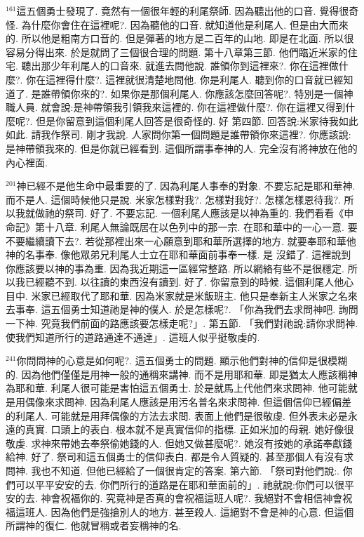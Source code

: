 \documentclass{book}
\begin{document}
$^{161}$這五個勇士發現了.
竟然有一個很年輕的利尾祭師.
因為聽出他的口音.
覺得很奇怪.
為什麼你會住在這裡呢?.
因為聽他的口音.
就知道他是利尾人.
但是由大而來的.
所以他是粗南方口音的.
但是彈著的地方是二百年的山地.
即是在北面.
所以很容易分得出來.
於是就問了三個很合理的問題.
第十八章第三節.
他們臨近米家的住宅.
聽出那少年利尾人的口音來.
就進去問他說.
誰領你到這裡來?.
你在這裡做什麼?.
你在這裡得什麼?.
這裡就很清楚地問他.
你是利尾人.
聽到你的口音就已經知道了.
是誰帶領你來的?.
如果你是那個利尾人.
你應該怎麼回答呢?.
特別是一個神職人員.
就會說:是神帶領我引領我來這裡的.
你在這裡做什麼?.
你在這裡又得到什麼呢?.
但是你留意到這個利尾人回答是很奇怪的.
好 第四節.
回答說:米家待我如此如此.
請我作祭司.
剛才我說.
人家問你第一個問題是誰帶領你來這裡?.
你應該說:是神帶領我來的.
但是你就已經看到.
這個所謂事奉神的人.
完全沒有將神放在他的內心裡面.

$^{201}$神已經不是他生命中最重要的了.
因為利尾人事奉的對象.
不要忘記是耶和華神.
而不是人.
這個時候他只是說.
米家怎樣對我?.
怎樣對我好?.
怎樣怎樣恩待我?.
所以我就做祂的祭司.
好了.
不要忘記.
一個利尾人應該是以神為重的.
我們看看《申命記》第十八章.
利尾人無論既居在以色列中的那一宗.
在耶和華中的一心一意.
要不要繼續讀下去?.
若從那裡出來一心願意到耶和華所選擇的地方.
就要奉耶和華他神的名事奉.
像他眾弟兄利尾人士立在耶和華面前事奉一樣.
是 沒錯了.
這裡說到你應該要以神的事為重.
因為我近期這一區經常整路.
所以網絡有些不是很穩定.
所以我已經聽不到.
以往讀的東西沒有讀到.
好了.
你留意到的時候.
這個利尾人他心目中.
米家已經取代了耶和華.
因為米家就是米飯班主.
他只是奉新主人米家之名來去事奉.
這五個勇士知道祂是神的僕人.
於是怎樣呢?.
「你為我們去求問神吧.
詢問一下神.
究竟我們前面的路應該要怎樣走呢?」.
第五節.
「我們對祂說:請你求問神.
使我們知道所行的道路通達不通達」.
這班人似乎挺敬虔的.

$^{241}$你問問神的心意是如何呢?.
這五個勇士的問題.
顯示他們對神的信仰是很模糊的.
因為他們僅僅是用神一般的通稱來講神.
而不是用耶和華.
即是猶太人應該稱神為耶和華.
利尾人很可能是害怕這五個勇士.
於是就馬上代他們來求問神.
他可能就是用偶像來求問神.
因為利尾人應該是用污名普名來求問神.
但這個信仰已經偏差的利尾人.
可能就是用拜偶像的方法去求問.
表面上他們是很敬虔.
但外表未必是永遠的真實.
口頭上的表白.
根本就不是真實信仰的指標.
正如米加的母親.
她好像很敬虔.
求神來帶她去奉祭偷她錢的人.
但她又做甚麼呢?.
她沒有按她的承諾奉獻錢給神.
好了.
祭司和這五個勇士的信仰表白.
都是令人質疑的.
甚至那個人有沒有求問神.
我也不知道.
但他已經給了一個很肯定的答案.
第六節.
「祭司對他們說:.
你們可以平平安安的去.
你們所行的道路是在耶和華面前的」.
祂就說:你們可以很平安的去.
神會祝福你的.
究竟神是否真的會祝福這班人呢?.
我絕對不會相信神會祝福這班人.
因為他們是強搶別人的地方.
甚至殺人.
這絕對不會是神的心意.
但這個所謂神的復仁.
他就冒稱或者妄稱神的名.
\end{document}
